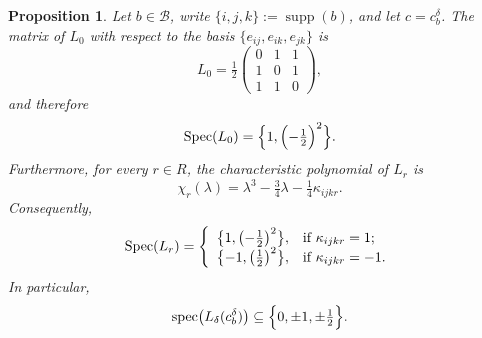 \documentclass[10pt,a4paper]{amsart}
\newtheorem{proposition}[theorem]{Proposition}
\numberwithin{equation}{section}
\DeclareMathOperator{\spec}{spec}
\DeclareMathOperator{\supp}{supp}
\DeclareMathOperator{\Spec}{Spec}
\begin{document}
\begin{proposition}\label{prop:blockmatrices}
Let $b\in\mathcal B$, write $\{i,j,k\}:=\supp(b)$, and let $c=c_b^\delta$. The matrix of $L_0$ with respect to the basis $\{e_{ij},e_{ik},e_{jk}\}$ is
\begin{equation}\label{L0matrix}
L_0
=
\tfrac12
\begin{pmatrix}
0&1&1\\
1&0&1\\
1&1&0
\end{pmatrix},
\end{equation}
and therefore
\begin{equation}\label{specL0}
\Spec(L_0)
=
\Bigl\{
1,
\Bigl(-\tfrac12\Bigr)^2
\Bigr\}.
\end{equation}
Furthermore, for every $r\in R$, the characteristic polynomial of $L_r$ is
\begin{equation}\label{charpolyr}
\chi_r(\lambda)
=
\lambda^3-\tfrac34\lambda-\tfrac14\kappa_{ijkr}.
\end{equation}
Consequently,
\begin{equation}\label{specplus}
\Spec(L_r)
=
\left\{
  \begin{array}{ll}
    \bigl\{1,\bigl(-\tfrac12\bigr)^2\bigr\}, & \hbox{if $\kappa_{ijkr}=1$;} \\
    \bigl\{-1,\bigl(\tfrac12\bigr)^2\bigr\}, & \hbox{if $\kappa_{ijkr}=-1$.}
  \end{array}
\right.
\end{equation}
In particular,
\begin{equation}\label{fiveeigen}
\spec\bigl(L_\delta(c_b^\delta)\bigr)
\subseteq
\Bigl\{
0,\pm1,\pm\tfrac12
\Bigr\}.
\end{equation}
\end{proposition}
\end{document}
